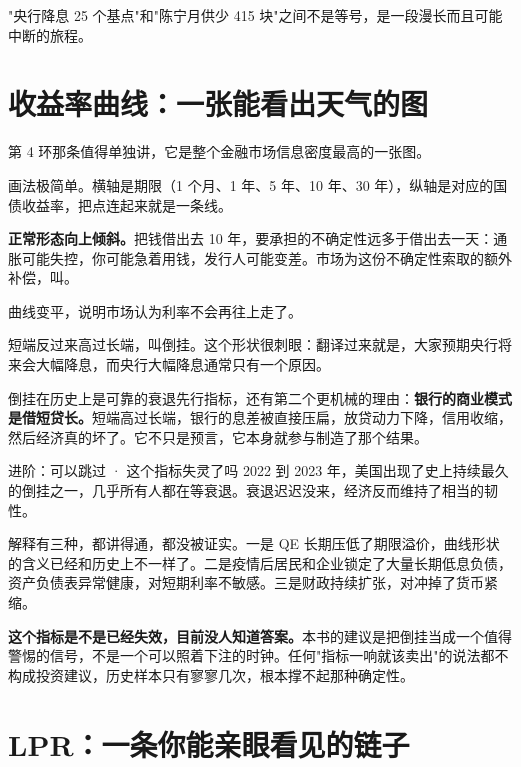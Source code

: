"央行降息 25 个基点"和"陈宁月供少 415 块"之间不是等号，是一段漫长而且可能中断的旅程。

\section{收益率曲线：一张能看出天气的图}

第 4 环那条值得单独讲，它是整个金融市场信息密度最高的一张图。

画法极简单。横轴是期限（1 个月、1 年、5 年、10 年、30 年），纵轴是对应的国债收益率，把点连起来就是一条线。

\textbf{正常形态向上倾斜。}把钱借出去 10 年，要承担的不确定性远多于借出去一天：通胀可能失控，你可能急着用钱，发行人可能变差。市场为这份不确定性索取的额外补偿，叫。

曲线变平，说明市场认为利率不会再往上走了。

短端反过来高过长端，叫倒挂。这个形状很刺眼：翻译过来就是，大家预期央行将来会大幅降息，而央行大幅降息通常只有一个原因。

倒挂在历史上是可靠的衰退先行指标，还有第二个更机械的理由：\textbf{银行的商业模式是借短贷长。}短端高过长端，银行的息差被直接压扁，放贷动力下降，信用收缩，然后经济真的坏了。它不只是预言，它本身就参与制造了那个结果。

\begin{deepbox}{进阶：可以跳过 · 这个指标失灵了吗}
2022 到 2023 年，美国出现了史上持续最久的倒挂之一，几乎所有人都在等衰退。衰退迟迟没来，经济反而维持了相当的韧性。

解释有三种，都讲得通，都没被证实。一是 QE 长期压低了期限溢价，曲线形状的含义已经和历史上不一样了。二是疫情后居民和企业锁定了大量长期低息负债，资产负债表异常健康，对短期利率不敏感。三是财政持续扩张，对冲掉了货币紧缩。

\textbf{这个指标是不是已经失效，目前没人知道答案。}本书的建议是把倒挂当成一个值得警惕的信号，不是一个可以照着下注的时钟。任何"指标一响就该卖出"的说法都不构成投资建议，历史样本只有寥寥几次，根本撑不起那种确定性。

\end{deepbox}

\section{LPR：一条你能亲眼看见的链子}

